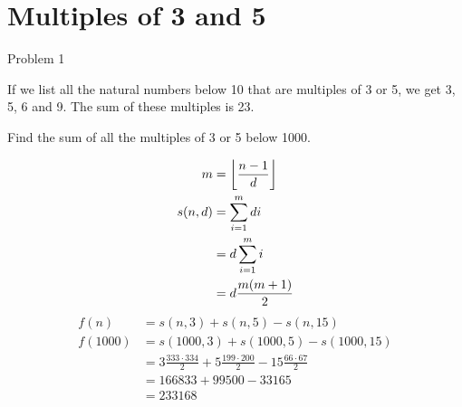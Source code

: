 \documentclass{article}
\DeclarePairedDelimiter\floor{\lfloor}{\rfloor}
\begin{document}
  \section{Multiples of 3 and 5}
  Problem 1
  
  If we list all the natural numbers below 10 that are multiples of 3 or 5,
  we get 3, 5, 6 and 9. The sum of these multiples is 23.

  Find the sum of all the multiples of 3 or 5 below 1000.

  \begin{equation*}
    \begin{split}
      m &= \floor*{\frac{n-1}{d}} \\
      s(n,d)
      &= \sum\limits_{i=1}^{m} di \\
      &= d\sum\limits_{i=1}^{m} i \\
      &= d\frac{m(m + 1)}{2}
    \end{split}
  \end{equation*}
  \begin{equation*}
    \begin{split}
      f(n) &= s(n, 3) + s(n, 5) - s(n, 15) \\
      f(1000)
      &= s(1000, 3) + s(1000, 5) - s(1000, 15) \\
      &= 3\frac{333\cdot334}{2}
      + 5\frac{199\cdot200}{2}
      - 15\frac{66\cdot67}{2} \\
      &= 166833 + 99500 - 33165 \\
      &= 233168
    \end{split}
  \end{equation*}
\end{document}
